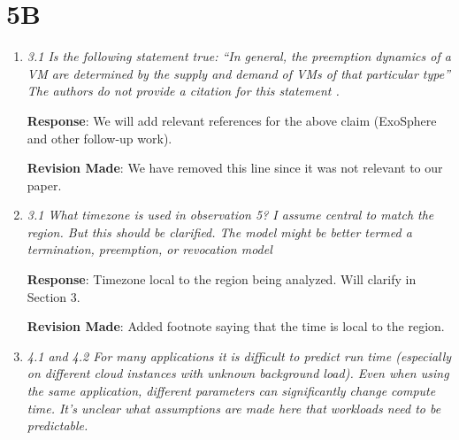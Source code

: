 \documentclass{article}
\newcommand{\resp}[1]{\textbf{Response}: #1}
\newcommand{\revmade}[1]{\textbf{Revision Made}: #1}
\begin{document}
\section{5B}

\begin{enumerate}


\item \emph{3.1 Is the following statement true: “In general, the preemption dynamics of a VM are determined by the supply and demand of VMs of that particular type” The authors do not provide a citation for this statement .}

  \resp{We will add relevant references for the above claim (ExoSphere and other follow-up work).}
  

\revmade{We have removed this line since it was not relevant to our paper. }

\item \emph{3.1 What timezone is used in observation 5? I assume central to match the region. But this should be clarified.
The model might be better termed a termination, preemption, or revocation model}

\resp{Timezone local to the region being analyzed. Will clarify in Section 3.}

\revmade{Added footnote saying that the time is local to the region.}








\item \emph{4.1 and 4.2 For many applications it is difficult to predict run time (especially on different cloud instances with unknown background load). Even when using the same application, different parameters can significantly change compute time. It's unclear what assumptions are made here that workloads need to be predictable.}
  

\end{enumerate}
\end{document}
